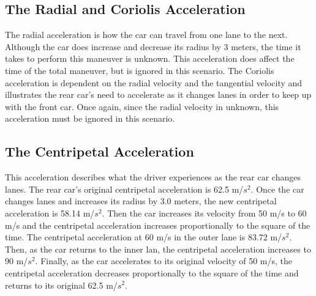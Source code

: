 \documentclass{article}
\begin{document}
\subsection{The Radial and Coriolis Acceleration}
The radial acceleration is how the car can travel from one lane to the next. Although the car does increase and decrease its radius by 3 meters, the time it takes to perform this maneuver is unknown. This acceleration does affect the time of the total maneuver, but is ignored in this scenario. The Coriolis acceleration is dependent on the radial velocity and the tangential velocity and illustrates the rear car's need to accelerate as it changes lanes in order to keep up with the front car. Once again, since the radial velocity in unknown, this acceleration must be ignored in this scenario.
\subsection{The Centripetal Acceleration}
This acceleration describes what the driver experiences as the rear car changes lanes. The rear car's original centripetal acceleration is 62.5 m/${s^2}$. Once the car changes lanes and increases its radius by 3.0 meters, the new centripetal acceleration is 58.14 m/${s^2}$. Then the car increases its velocity from 50 m/s to 60 m/s and the centripetal acceleration increases proportionally to the square of the time. The centripetal acceleration at 60 m/s in the outer lane is 83.72 m/${s^2}$. Then, as the car returns to the inner lan, the centripetal acceleration increases to 90 m/${s^2}$. Finally, as the car accelerates to its original velocity of 50 m/s, the centripetal acceleration decreases proportionally to the square of the time and returns to its original 62.5 m/${s^2}$.
\end{document}
